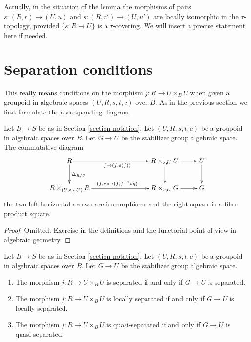 \noindent
Actually, in the situation of the lemma the morphisms of pairs
$s : (R, r) \to (U, u)$ and $s : (R, r') \to (U, u')$ are
locally isomorphic in the $\tau$-topology, provided $\{s: R \to U\}$ is a
$\tau$-covering. We will insert a precise statement here if needed.







\section{Separation conditions}
\label{section-separation}

\noindent
This really means conditions on the morphism $j : R \to U \times_B U$
when given a groupoid in algebraic spaces $(U, R, s, t, c)$ over $B$.
As in the previous section we first formulate the corresponding diagram.

\begin{lemma}
\label{lemma-diagram-diagonal}
Let $B \to S$ be as in Section \ref{section-notation}.
Let $(U, R, s, t, c)$ be a groupoid in algebraic spaces over $B$.
Let $G \to U$ be the stabilizer group algebraic space.
The commutative diagram
$$
\xymatrix{
R \ar[d]^{\Delta_{R/U}} \ar[rrr]_{f \mapsto (f, s(f))} & & &
R \times_{s, U} U \ar[d] \ar[r] & U \ar[d] \\
R \times_{(U \times_B U)} R \ar[rrr]^{(f, g) \mapsto (f, f^{-1} \circ g)} & & &
R \times_{s, U} G \ar[r] & G
}
$$
the two left horizontal arrows are isomorphisms
and the right square is a fibre product square.
\end{lemma}

\begin{proof}
Omitted.
Exercise in the definitions and the functorial point of
view in algebraic geometry.
\end{proof}

\begin{lemma}
\label{lemma-diagonal}
Let $B \to S$ be as in Section \ref{section-notation}.
Let $(U, R, s, t, c)$ be a groupoid in algebraic spaces over $B$.
Let $G \to U$ be the stabilizer group algebraic space.
\begin{enumerate}
\item The morphism $j : R \to U \times_B U$ is separated if and only if
$G \to U$ is separated.
\item The morphism $j : R \to U \times_B U$ is locally separated if and only
if $G \to U$ is locally separated.
\item The morphism $j : R \to U \times_B U$ is quasi-separated if and only
if $G \to U$ is quasi-separated.
\end{enumerate}
\end{lemma}

